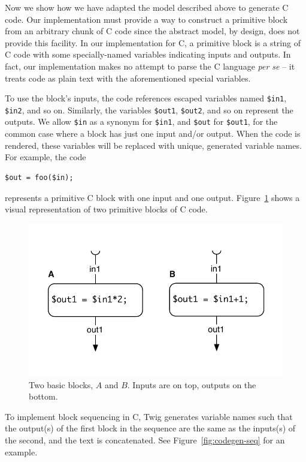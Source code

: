 Now we show how we have adapted the model described above to
generate C code. Our implementation must provide a way to
construct a primitive block from an arbitrary chunk of C code
since the abstract model, by design, does not provide this
facility. In our implementation for C, a primitive block is a
string of C code with some specially-named variables indicating
inputs and outputs. In fact, our implementation makes no attempt
to parse the C language \emph{per se} -- it treats code as plain
text with the aforementioned special variables.

To use the block's inputs, the code references escaped variables
named \texttt{\$in1}, \texttt{\$in2}, and so on. Similarly, the
variables \texttt{\$out1}, \texttt{\$out2}, and so on represent
the outputs. We allow \texttt{\$in} as a synonym for
\texttt{\$in1}, and \texttt{\$out} for \texttt{\$out1}, for the
common case where a block has just one input and/or output. When
the code is rendered, these variables will be replaced with
unique, generated variable names. For example, the code

\begin{verbatim}
$out = foo($in);
\end{verbatim}

represents a primitive C block with one input and one output.
Figure~\ref{fig:blocks} shows a visual representation of two
primitive blocks of C code.

\begin{figure}[ht]
\centering
\includegraphics[width=0.75\columnwidth]{images/code-gen1}
\caption{Two basic blocks, $A$ and $B$. Inputs are on top, outputs 
on the bottom.}
\label{fig:blocks}
\end{figure}

To implement block sequencing in C, Twig generates variable names
such that the output(s) of the first block in the sequence are the
same as the inputs(s) of the second, and the text is concatenated.
See Figure~\ref{fig:codegen-seq} for an example.

